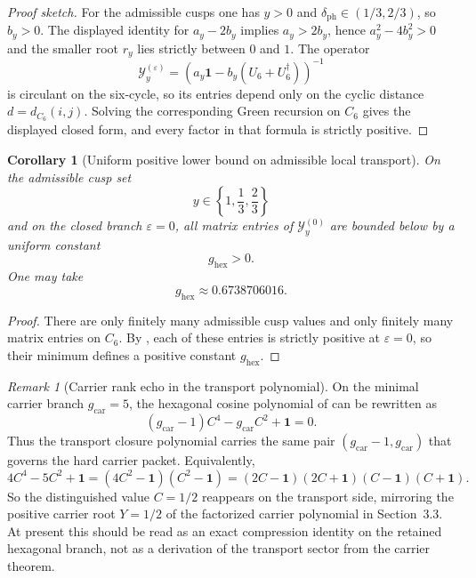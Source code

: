 \documentclass[11pt,a4paper]{article}
\newtheorem{corollary}[theorem]{Corollary}
\theoremstyle{definition}
\theoremstyle{remark}
\newtheorem*{remark}{Remark}
\newcommand{\gcar}{g_{\mathrm{car}}}
\begin{document}
\begin{proof}[Proof sketch]
For the admissible cusps one has $y>0$ and $\delta_{\mathrm{ph}}\in(1/3,2/3)$, so $b_y>0$. The
displayed identity for $a_y-2b_y$ implies $a_y>2b_y$, hence $a_y^2-4b_y^2>0$ and the smaller
root $r_y$ lies strictly between $0$ and $1$. The operator
\[
\mathcal Y_y^{(\varepsilon)}=(a_y\mathbf 1-b_y(U_6+U_6^\dagger))^{-1}
\]
is circulant on the six-cycle, so its entries depend only on the cyclic distance
$d=d_{C_6}(i,j)$. Solving the corresponding Green recursion on $C_6$ gives the displayed closed
form, and every factor in that formula is strictly positive.
\end{proof}

\begin{corollary}[Uniform positive lower bound on admissible local transport]
\label{cor:uniform-positive-c6-green}
On the admissible cusp set
\[
y\in\left\{1,\frac13,\frac23\right\}
\]
and on the closed branch $\varepsilon=0$, all matrix entries of $\mathcal Y_y^{(0)}$ are bounded
below by a uniform constant
\[
g_{\mathrm{hex}}>0.
\]
One may take
\[
g_{\mathrm{hex}}\approx \num{0.6738706016}.
\]
\end{corollary}

\begin{proof}
There are only finitely many admissible cusp values and only finitely many matrix entries on
$C_6$. By , each of these entries is strictly positive at
$\varepsilon=0$, so their minimum defines a positive constant $g_{\mathrm{hex}}$.
\end{proof}

\begin{remark}[Carrier rank echo in the transport polynomial]\label{rem:transport-rank-echo}
On the minimal carrier branch $\gcar=5$, the hexagonal cosine polynomial of  can be rewritten as
\[
(\gcar-1)C^4-\gcar C^2+\mathbf 1=0.
\]
Thus the transport closure polynomial carries the same pair $(\gcar-1,\gcar)$ that governs the hard carrier packet. Equivalently,
\[
4C^4-5C^2+\mathbf 1=(4C^2-\mathbf 1)(C^2-\mathbf 1)=(2C-\mathbf 1)(2C+\mathbf 1)(C-\mathbf 1)(C+\mathbf 1).
\]
So the distinguished value $C=1/2$ reappears on the transport side, mirroring the positive carrier root $Y=1/2$ of the factorized carrier polynomial in Section~3.3. At present this should be read as an exact compression identity on the retained hexagonal branch, not as a derivation of the transport sector from the carrier theorem.
\end{remark}
\end{document}
